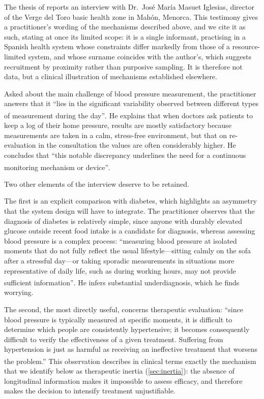\documentclass[12pt,a4paper,oneside]{report}
\newcommand{\bq}[1]{``#1''\textsuperscript{\dag}}
\begin{document}
The thesis of \textcite{navarro2023} reports an interview with Dr.\ José María Masuet Iglesias, director of the Verge del Toro basic health zone in Mahón, Menorca. This testimony gives a practitioner's wording of the mechanisms described above, and we cite it as such, stating at once its limited scope: it is a single informant, practising in a Spanish health system whose constraints differ markedly from those of a resource-limited system, and whose surname coincides with the author's, which suggests recruitment by proximity rather than purposive sampling. It is therefore not data, but a clinical illustration of mechanisms established elsewhere.

Asked about the main challenge of blood pressure measurement, the practitioner answers that it \bq{lies in the significant variability observed between different types of measurement during the day}. He explains that when doctors ask patients to keep a log of their home pressure, results are mostly satisfactory because measurements are taken in a calm, stress-free environment, but that on re-evaluation in the consultation the values are often considerably higher. He concludes that \bq{this notable discrepancy underlines the need for a continuous monitoring mechanism or device}.

Two other elements of the interview deserve to be retained.

The first is an explicit comparison with diabetes, which highlights an asymmetry that the system design will have to integrate. The practitioner observes that the diagnosis of diabetes is relatively simple, since anyone with durably elevated glucose outside recent food intake is a candidate for diagnosis, whereas assessing blood pressure is a complex process: \bq{measuring blood pressure at isolated moments that do not fully reflect the usual lifestyle---sitting calmly on the sofa after a stressful day---or taking sporadic measurements in situations more representative of daily life, such as during working hours, may not provide sufficient information}. He infers substantial underdiagnosis, which he finds worrying.

The second, the most directly useful, concerns therapeutic evaluation: \bq{since blood pressure is typically measured at specific moments, it is difficult to determine which people are consistently hypertensive; it becomes consequently difficult to verify the effectiveness of a given treatment. Suffering from hypertension is just as harmful as receiving an ineffective treatment that worsens the problem.} This observation describes in clinical terms exactly the mechanism that we identify below as therapeutic inertia (\cref{sec:inertia}): the absence of longitudinal information makes it impossible to assess efficacy, and therefore makes the decision to intensify treatment unjustifiable.
\end{document}
